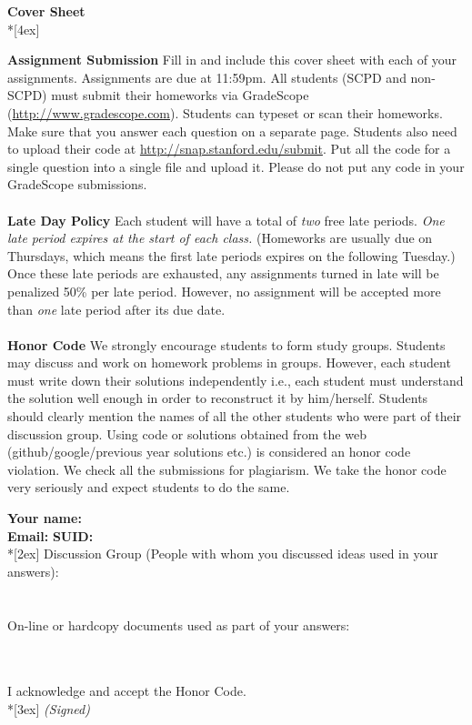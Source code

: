 \documentclass[11pt]{article}
\begin{document}
\pagebreak[4]
\begin{center}
\LARGE{\bf \textsf{Cover Sheet}} \\*[4ex]
\end{center}

\textbf{Assignment Submission } Fill in and include this cover sheet with each of your assignments. Assignments are due at 11:59pm. All students (SCPD and non-SCPD) must submit their homeworks via GradeScope (\url{http://www.gradescope.com}). Students can typeset or scan their homeworks. Make sure that you answer each question on a separate page. Students also need to upload their code at \url{http://snap.stanford.edu/submit}. Put all the code for a single question into a single file and upload it. Please do not put any code in your GradeScope submissions.
\\
\\
\textbf{Late Day Policy } Each student will have a total of {\em two} free late periods. {\em One late period expires at the start of each class.} (Homeworks are usually due on Thursdays, which means the first late periods expires on the following Tuesday.) Once these late periods are exhausted, any assignments turned in late will be penalized 50\% per late period. However, no assignment will be accepted more than {\em one} late period after its due date.
\\
\\
\textbf{Honor Code } We strongly encourage students to form study groups. Students may discuss and work on homework problems in groups. However, each student must write down their solutions independently i.e., each student must understand the solution well enough in order to reconstruct it by him/herself.  Students should clearly mention the names of all the other students who were part of their discussion group. Using code or solutions obtained from the web (github/google/previous year solutions etc.) is considered an honor code violation. We check all the submissions for plagiarism. We take the honor code very seriously and expect students to do the same.

\vfill
\vfill

{\Large
\textbf{Your name:} \hrulefill \\
\textbf{Email:} \underline{\hspace*{7cm}} \textbf{SUID:} \hrulefill\\*[2ex] }
Discussion Group (People with whom you discussed ideas used in your answers): \\\\\\
On-line or hardcopy documents used as part of your answers: \\\\\\
\vfill

\vfill

I acknowledge and accept the Honor Code.\\*[3ex]
\bigskip
\textit{(Signed)}\hrulefill

\vfill
\vfill
\end{document}
